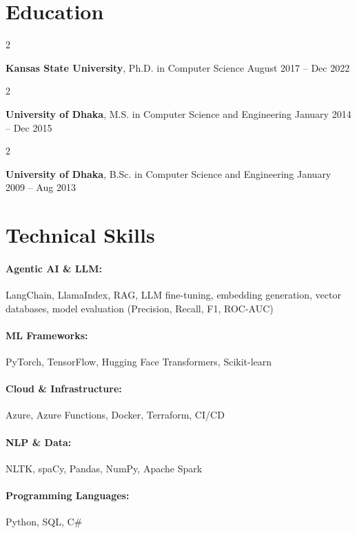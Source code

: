 \documentclass[10pt, letterpaper]{article}
\newenvironment{twocolentry}[2][]{
    \onecolentry
    \def\secondColumn{#2}
    \setcolumnwidth{\fill, 4.5 cm}
    \begin{paracol}{2}
}{
    \switchcolumn \raggedleft \secondColumn
    \end{paracol}
    \endonecolentry
} %
\begin{document}
\section{Education}

        \begin{twocolentry}{
            August 2017 -- Dec 2022
        }
            \textbf{Kansas State University}, Ph.D. in Computer Science\end{twocolentry}

        \begin{twocolentry}{
            January 2014 -- Dec 2015
        }
            \textbf{University of Dhaka}, M.S. in Computer Science and Engineering\end{twocolentry}

        \begin{twocolentry}{
            January 2009 -- Aug 2013
        }
            \textbf{University of Dhaka}, B.Sc. in Computer Science and Engineering\end{twocolentry}

\vspace{-1.5mm}
\section{Technical Skills}

        \paragraph{Agentic AI \& LLM:} LangChain, LlamaIndex, RAG, LLM fine-tuning, embedding generation, vector databases, model evaluation (Precision, Recall, F1, ROC-AUC)
        \vspace{-4mm}
        \paragraph{ML Frameworks:} PyTorch, TensorFlow, Hugging Face Transformers, Scikit-learn
        \vspace{-4mm}
        \paragraph{Cloud \& Infrastructure:} Azure, Azure Functions, Docker, Terraform, CI/CD
        \vspace{-4mm}
        \paragraph{NLP \& Data:} NLTK, spaCy, Pandas, NumPy, Apache Spark
        \vspace{-4mm}
        \paragraph{Programming Languages:} Python, SQL, C\#
\end{document}
